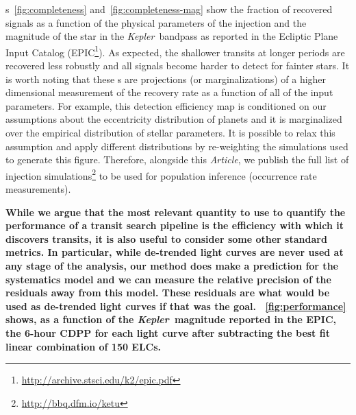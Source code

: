 \documentclass[12pt,preprint]{aastex}
\newcommand{\project}[1]{\textsl{#1}} %
\newcommand{\kepler}{\project{Kepler}}
\newcommand{\paper}{\textsl{Article}}
\newcommand{\figref}[1]{\ref{fig:#1}}
\newcommand{\Fig}[1]{\figurename~\figref{#1}}
\newcommand{\response}[1]{{\color{mygreen} {\bf #1}}}
\newcommand{\datareleaseurl}{{\url{http://bbq.dfm.io/ketu}}}
\begin{document}
\figurename s~\figref{completeness} and~\figref{completeness-mag} show the
fraction of recovered signals as a function of the physical parameters of the
injection and the magnitude of the star in the \kepler\ bandpass as reported
in the Ecliptic Plane Input Catalog
(EPIC\footnote{\url{http://archive.stsci.edu/k2/epic.pdf}}).
As expected, the shallower transits at longer periods are recovered less
robustly and all signals become harder to detect for fainter stars.
It is worth noting that these \figurename s are projections (or
marginalizations) of a higher dimensional measurement of the recovery rate as
a function of all of the input parameters.
For example, this detection efficiency map is conditioned on our assumptions
about the eccentricity distribution of planets and it is marginalized over the
empirical distribution of stellar parameters.
It is possible to relax this assumption and apply different distributions by
re-weighting the simulations used to generate this figure.
Therefore, alongside this \paper, we publish the full list of injection
simulations\footnote{\datareleaseurl} to be used for population inference
(occurrence rate measurements).

\response{%
While we argue that the most relevant quantity to use to quantify the
performance of a transit search pipeline is the efficiency with which it
discovers transits, it is also useful to consider some other standard metrics.
In particular, while de-trended light curves are never used at any stage of
the analysis, our method does make a prediction for the systematics model and
we can measure the relative precision of the residuals away from this model.
These residuals are what would be used as de-trended light curves if that was
the goal.
\Fig{performance} shows, as a function of the \kepler\ magnitude reported in
the EPIC, the 6-hour CDPP \citep{Christiansen:2012} for each light curve after
subtracting the best fit linear combination of 150 ELCs.
}
\end{document}
